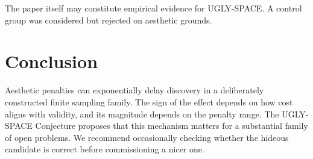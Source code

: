 \documentclass[11pt]{article}
\theoremstyle{remark}
\begin{document}
The paper itself may constitute empirical evidence for UGLY-SPACE. A control
group was considered but rejected on aesthetic grounds.

\section{Conclusion}

Aesthetic penalties can exponentially delay discovery in a deliberately
constructed finite sampling family. The sign of the effect depends on how
cost aligns with validity, and its magnitude depends on the penalty range.
The UGLY-SPACE Conjecture proposes that this mechanism matters for a
substantial family of open problems. We recommend occasionally checking
whether the hideous candidate is
correct before commissioning a nicer one.



\end{document}
